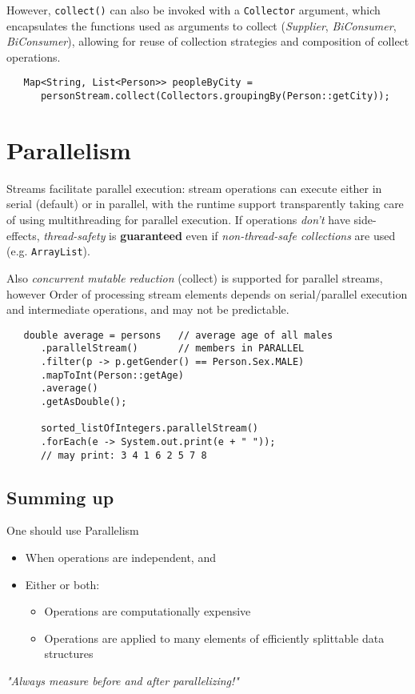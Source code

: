 However, \lstinline|collect()| can also be invoked with a \lstinline|Collector| argument,
which encapsulates the functions used as
arguments to collect (\textit{Supplier}, \textit{BiConsumer},
\textit{BiConsumer}),
allowing for reuse of collection strategies and composition of collect operations.

\begin{lstlisting}
   Map<String, List<Person>> peopleByCity =
      personStream.collect(Collectors.groupingBy(Person::getCity));
\end{lstlisting}

\section{Parallelism}
Streams facilitate parallel execution:
stream operations can execute either in serial
(default) or in parallel, with the runtime support transparently taking care of using multithreading
for parallel execution.
If operations \textit{don’t} have side-effects, \textit{thread-safety} is
\textbf{guaranteed} even if \textit{non-thread-safe collections} are
used (e.g. \lstinline|ArrayList|).

Also \textit{concurrent mutable reduction} (collect) is supported for parallel streams, however
Order of processing stream elements depends on
serial/parallel execution and intermediate operations,
and may not be predictable.

\begin{lstlisting}
   double average = persons   // average age of all males
      .parallelStream()       // members in PARALLEL
      .filter(p -> p.getGender() == Person.Sex.MALE)
      .mapToInt(Person::getAge)
      .average()
      .getAsDouble();

      sorted_listOfIntegers.parallelStream()
      .forEach(e -> System.out.print(e + " "));
      // may print: 3 4 1 6 2 5 7 8
\end{lstlisting}

\subsection{Summing up}
One should use Parallelism
\begin{itemize}
   \item When operations are independent, and
   \item Either or both:
   \begin{itemize}
      \item Operations are computationally expensive
      \item Operations are applied to many elements of efficiently splittable data structures
   \end{itemize}
\end{itemize}
\emph{"Always measure before and after \emph{parallelizing}!"}



